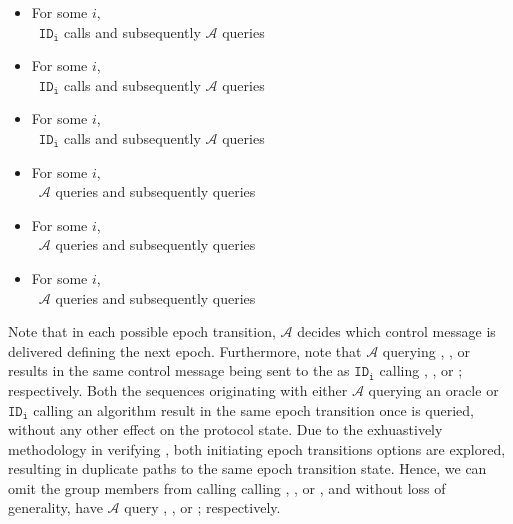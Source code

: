 \begin{itemize}
  \item For some \(i\),\\~\hspace{4em}\(\mathtt{ID_i}\) calls  and subsequently \(\mathcal{A}\) queries 
  \item For some \(i\),\\~\hspace{4em}\(\mathtt{ID_i}\) calls  and subsequently \(\mathcal{A}\) queries 
  \item For some \(i\),\\~\hspace{4em}\(\mathtt{ID_i}\) calls  and subsequently \(\mathcal{A}\) queries 
  \item For some \(i\),\\~\hspace{4em}\(\mathcal{A}\) queries     and subsequently queries 
  \item For some \(i\),\\~\hspace{4em}\(\mathcal{A}\) queries  and subsequently queries 
  \item For some \(i\),\\~\hspace{4em}\(\mathcal{A}\) queries  and subsequently queries 
\end{itemize}

Note that in each possible epoch transition, \(\mathcal{A}\) decides which control message is delivered defining the next epoch.
Furthermore, note that \(\mathcal{A}\) querying , , or  results in the same control message being sent to the  as \(\mathtt{ID_i}\) calling , , or ; respectively.
Both the sequences originating with either \(\mathcal{A}\) querying an oracle or \(\mathtt{ID_i}\) calling an algorithm result in the same epoch transition once  is queried, without any other effect on the protocol state.
Due to the exhuastively methodology in verifying , both initiating epoch transitions options are explored, resulting in duplicate paths to the same epoch transition state.
Hence, we can omit the group members from calling calling , , or , and without loss of generality, have \(\mathcal{A}\) query , , or ; respectively.




